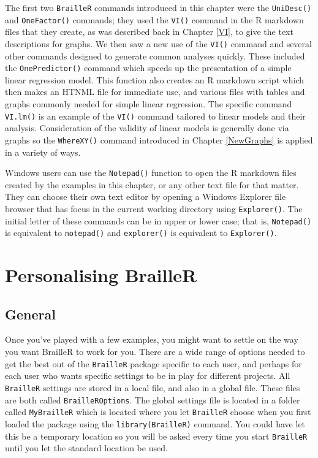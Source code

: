 \documentclass[
]{book}
\begin{document}
The first two \texttt{BrailleR} commands introduced in this chapter were the \texttt{UniDesc()} and \texttt{OneFactor()} commands; they used the \texttt{VI()} command in the R markdown files that they create, as was described back in Chapter \ref{VI}, to give the text descriptions for graphs. We then saw a new use of the \texttt{VI()} command and several other commands designed to generate common analyses quickly. These included the \texttt{OnePredictor()} command which speeds up the presentation of a simple linear regression model. This function also creates an R markdown script which then makes an HTNML file for immediate use, and various files with tables and graphs commonly needed for simple linear regression. The specific command \texttt{VI.lm()} is an example of the \texttt{VI()} command tailored to linear models and their analysis. Consideration of the validity of linear models is generally done via graphs so the \texttt{WhereXY()} command introduced in Chapter \ref{NewGraphs} is applied in a variety of ways.

Windows users can use the \texttt{Notepad()} function to open the R markdown files created by the examples in this chapter, or any other text file for that matter. They can choose their own text editor by opening a Windows Explorer file browser that has focus in the current working directory using \texttt{Explorer()}. The initial letter of these commands can be in upper or lower case; that is, \texttt{Notepad()} is equivalent to \texttt{notepad()} and \texttt{explorer()} is equivalent to \texttt{Explorer()}.

\hypertarget{Personalising}{%
\chapter{Personalising BrailleR}\label{Personalising}}

\hypertarget{general}{%
\section{General}\label{general}}

Once you've played with a few examples, you might want to settle on the way you want BrailleR to work for you.
There are a wide range of options needed to get the best out of the \texttt{BrailleR} package specific to each user, and perhaps for each user who wants specific settings to be in play for different projects. All \texttt{BrailleR} settings are stored in a local file, and also in a global file. These files are both called \texttt{BrailleROptions}. The global settings file is located in a folder called \texttt{MyBrailleR} which is located where you let \texttt{BrailleR} choose when you first loaded the package using the \texttt{library(BrailleR)} command. You could have let this be a temporary location so you will be asked every time you start \texttt{BrailleR} until you let the standard location be used.
\end{document}
